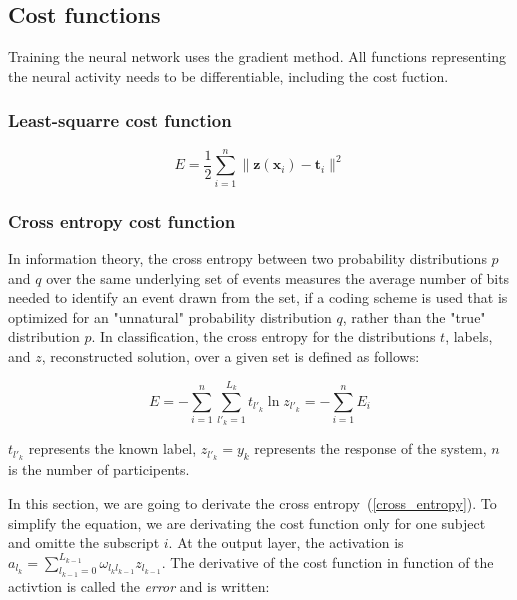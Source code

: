 \documentclass[final, paper=letter,5p,times,twocolumn]{elsarticle}
\begin{document}
\subsection{Cost functions}

Training the neural network uses the gradient method. All functions representing the neural activity needs to be differentiable, including the cost fuction.

\subsubsection{Least-squarre cost function}

\begin{equation}
  E = \frac{1}{2} \sum_{i = 1}^{n} \| \bm{z}(\bm{x}_{i}) - \bm{t}_{i} \|^{2}
  \label{least_squarre}
\end{equation}

\subsubsection{Cross entropy cost function}
\label{Cross_entropy_cost_function_sec}

In information theory, the cross entropy between two probability distributions $p$ and $q$ over the same underlying set of events measures the average number of bits needed to identify an event drawn from the set, if a coding scheme is used that is optimized for an "unnatural" probability distribution $q$, rather than the "true" distribution $p$. In classification, the cross entropy for the distributions $t$, labels, and $z$, reconstructed solution, over a given set is defined as follows:

\begin{equation}
  E = - \sum_{i = 1}^{n}\sum_{l'_{k} = 1}^{L_{k}} t_{l'_{k}} \ln z_{l'_{k}} =  - \sum_{i = 1}^{n} E_{i}
  \label{cross_entropy}
\end{equation}

$t_{l'_{k}}$ represents the known label, $z_{l'_{k}} = y_{k}$ represents the response of the system, $n$ is the number of participents. 

In this section, we are going to derivate the cross entropy~(\ref{cross_entropy}). To simplify the equation, we are derivating the cost function only for one subject and omitte the subscript $i$. At the output layer, the activation is $a_{l_{k}} = \sum_{l_{k-1} = 0}^{L_{k-1}} \omega_{l_{k}l_{k-1}} z_{l_{k-1}}$. The derivative of the cost function in function of the activtion is called the {\it error} and is written:
\end{document}
